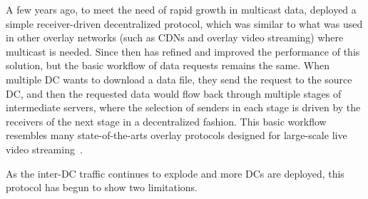 A few years ago, to meet the need of rapid growth in multicast
data, \company deployed a simple
receiver-driven decentralized protocol, which
was similar to what was used in other overlay networks
(such as CDNs and overlay video streaming)
where multicast is needed.
Since then \company has refined and improved the performance of
this solution, but the basic workflow of
data requests remains the same.
When multiple DC wants to download a data
file, they send the request to the source DC, and then the
requested data would flow back through multiple stages of
intermediate servers, where the selection of senders in each stage
is driven by the receivers of the next stage in a decentralized
fashion.
This basic workflow resembles many state-of-the-arts overlay
protocols designed for large-scale live video
streaming~\cite{Andreev2013Designing,sripanidkulchai2004analysis,zhang2005coolstreaming}.


As the inter-DC traffic continues to explode and more DCs are
deployed, this protocol has begun to show two limitations.


